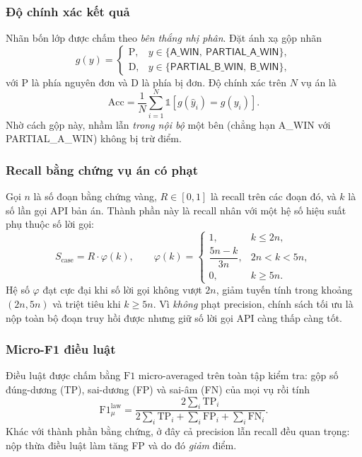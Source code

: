 \documentclass[conference]{IEEEtran}
\begin{document}
\subsubsection{Độ chính xác kết quả}
Nhãn bốn lớp được chấm theo \emph{bên thắng nhị phân}. Đặt ánh xạ gộp nhãn
\begin{equation}
  g(y)=
  \begin{cases}
    \mathrm{P}, & y\in\{\textsf{A\_WIN},\ \textsf{PARTIAL\_A\_WIN}\},\\
    \mathrm{D}, & y\in\{\textsf{PARTIAL\_B\_WIN},\ \textsf{B\_WIN}\},
  \end{cases}
\end{equation}
với $\mathrm{P}$ là phía nguyên đơn và $\mathrm{D}$ là phía bị đơn. Độ chính xác
trên $N$ vụ án là
\begin{equation}
  \mathrm{Acc}=\frac{1}{N}\sum_{i=1}^{N}
  \mathbb{1}\!\left[g(\hat{y}_i)=g(y_i)\right].
\end{equation}
Nhờ cách gộp này, nhầm lẫn \emph{trong nội bộ} một bên (chẳng hạn \textsf{A\_WIN}
với \textsf{PARTIAL\_A\_WIN}) không bị trừ điểm.

\subsubsection{Recall bằng chứng vụ án có phạt}
Gọi $n$ là số đoạn bằng chứng vàng, $R\in[0,1]$ là recall trên các đoạn đó, và
$k$ là số lần gọi API bản án. Thành phần này là recall nhân với một hệ số hiệu
suất phụ thuộc số lời gọi:
\begin{equation}
  S_{\text{case}} = R\cdot\varphi(k),
  \qquad
  \varphi(k)=
  \begin{cases}
    1, & k \le 2n,\\[2pt]
    \dfrac{5n-k}{3n}, & 2n < k < 5n,\\[6pt]
    0, & k \ge 5n.
  \end{cases}
  \label{eq:penalty}
\end{equation}
Hệ số $\varphi$ đạt cực đại khi số lời gọi không vượt $2n$, giảm tuyến tính trong
khoảng $(2n,5n)$ và triệt tiêu khi $k\ge 5n$. Vì \emph{không} phạt precision,
chính sách tối ưu là nộp toàn bộ đoạn truy hồi được nhưng giữ số lời gọi API
càng thấp càng tốt.

\subsubsection{Micro-F1 điều luật}
Điều luật được chấm bằng $\mathrm{F1}$ micro-averaged trên toàn tập kiểm tra:
gộp số đúng-dương (TP), sai-dương (FP) và sai-âm (FN) của mọi vụ rồi tính
\begin{equation}
  \mathrm{F1}^{\text{law}}_{\mu}
  =\frac{2\sum_i \mathrm{TP}_i}
  {2\sum_i \mathrm{TP}_i+\sum_i \mathrm{FP}_i+\sum_i \mathrm{FN}_i}.
  \label{eq:microf1}
\end{equation}
Khác với thành phần bằng chứng, ở đây cả precision lẫn recall đều quan trọng:
nộp thừa điều luật làm tăng FP và do đó \emph{giảm} điểm.
\end{document}
